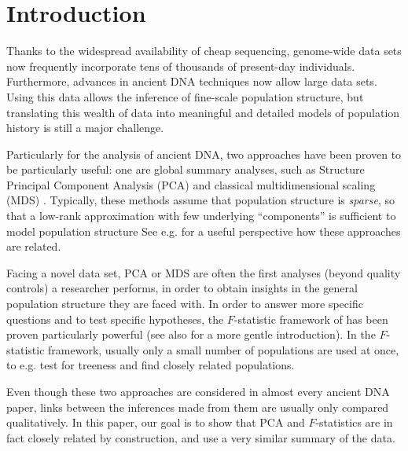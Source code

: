 \documentclass[10pt,a4paper]{article}
\begin{document}
\section{Introduction}
Thanks to the widespread availability of cheap sequencing, genome-wide data sets now frequently incorporate tens of thousands of present-day individuals\cite{gnomad2020}. Furthermore, advances in ancient DNA techniques now allow large data sets. Using this data allows the inference of fine-scale population structure, but translating this wealth of data into meaningful and detailed models of population history is still a major challenge. 

Particularly for the analysis of ancient DNA, two approaches have been proven to be particularly useful: one are global summary analyses, such as Structure \citep{pritchard2000, alexander2009} Principal Component Analysis (PCA) \citep{cavalli-sforza1994, reich2008, novembre2008, mcvean2009} and classical multidimensional scaling (MDS) \cite{fu2016, malaspinas_bammds}. Typically, these methods assume that population structure is \emph{sparse}, so that a low-rank approximation with few underlying ``components'' is sufficient to model population structure See e.g. \cite{engelhardt2010} for a useful perspective how these approaches are related.

Facing a novel data set, PCA or MDS are often the first analyses (beyond quality controls) a researcher performs, in order to obtain insights in the general population structure they are faced with. In order to answer more specific questions and to test specific hypotheses, the $F$-statistic framework of \cite{patterson2012} has been proven particularly powerful (see also \cite{peter2016} for a more gentle introduction). In the $F$-statistic framework, usually only a small number of populations are used at once, to e.g. test for treeness and find closely related populations.

Even though these two approaches are considered in almost every ancient DNA paper, links between the inferences made from them are usually only compared qualitatively. In this paper, our goal is to show that PCA and $F$-statistics are in fact closely related by construction, and use a very similar summary of the data. 
\end{document}
